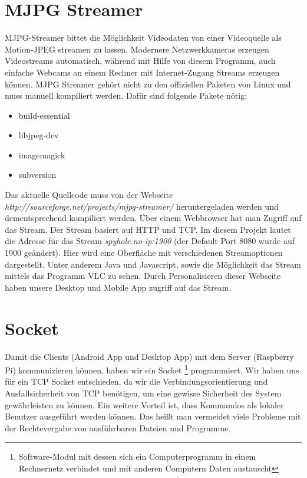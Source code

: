  
\section{MJPG Streamer}
MJPG-Streamer bittet die Möglichkeit Videodaten von einer Videoquelle als Motion-JPEG streamen zu lassen. Modernere Netzwerkkameras erzeugen Videostreams automatisch, während mit Hilfe von diesem Programm, auch einfache Webcams an einem Rechner mit Internet-Zugang Streams erzeugen können. MJPG Streamer gehört nicht zu den offiziellen Paketen von Linux und muss manuell kompiliert werden. Dafür sind folgende Pakete nötig:

\begin{itemize}
  \item build-essential
  \item libjpeg-dev
  \item imagemagick
  \item subversion
\end{itemize}

Das aktuelle Quellcode muss von der Webseite \textit{http://sourceforge.net/projects/mjpg-streamer/} heruntergeladen werden und dementsprechend kompiliert werden.\cite{bib.mjpgStreamer} Über einem Webbrowser hat man Zugriff auf das Stream. Der Stream basiert auf HTTP und TCP.   Im diesem Projekt lautet die Adresse für das Stream \textit{spyhole.no-ip:1900} (der Default Port 8080 wurde auf 1900 geändert). Hier wird eine Oberfläche mit verschiedenen Streamoptionen dargestellt. Unter anderem Java und Javascript, sowie die Möglichkeit das Stream mittels das Programm VLC zu sehen. Durch Personalisieren dieser Webseite haben unsere Desktop und Mobile App zugriff auf das Stream.\\


\section{Socket}
Damit die Clients (Android App und Desktop App) mit dem Server (Raspberry Pi) kommunizieren können, haben wir ein Socket \footnote{Software-Modul mit dessen sich ein Computerprogramm in einem Rechnernetz verbindet und mit anderen Computern Daten austauscht} programmiert. Wir haben uns für ein TCP Socket entschieden, da wir die Verbindungsorientierung und Ausfallsicherheit von TCP benötigen, um eine gewisse Sicherheit des System gewährleisten zu können. Ein weitere Vorteil ist, dass Kommandos als lokaler Benutzer ausgeführt werden können. Das heißt man vermeidet viele Probleme mit der Rechtevergabe von ausführbaren Dateien und Programme.\\

